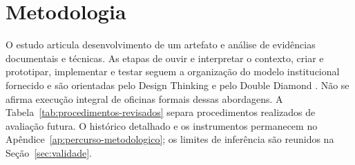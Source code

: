 \section{Metodologia}\label{sec:metodologia-revisada}
O estudo articula desenvolvimento de um artefato e análise de evidências documentais e técnicas. As etapas de ouvir e interpretar o contexto, criar e prototipar, implementar e testar seguem a organização do modelo institucional fornecido e são orientadas pelo Design Thinking e pelo Double Diamond \citep{ideo-designthinking,designcouncil}. Não se afirma execução integral de oficinas formais dessas abordagens. A Tabela~\ref{tab:procedimentos-revisados} separa procedimentos realizados de avaliação futura. O histórico detalhado e os instrumentos permanecem no Apêndice~\ref{ap:percurso-metodologico}; os limites de inferência são reunidos na Seção~\ref{sec:validade}.
\begingroup\small\SingleSpacing\setlength{\parskip}{0pt}\setlength{\tabcolsep}{4pt}
